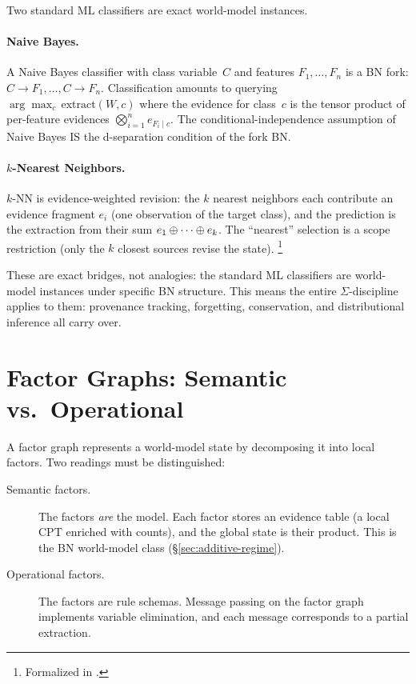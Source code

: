 \documentclass[11pt,openany]{report}
\begin{document}
Two standard ML classifiers are exact world-model instances.

\paragraph{Naive Bayes.}
A Naive Bayes classifier with class variable~$C$ and features
$F_1, \ldots, F_n$ is a BN fork: $C \to F_1, \ldots, C \to F_n$.
Classification amounts to querying
$\arg\max_c \,\mathrm{extract}(W, c)$ where the evidence for class~$c$
is the tensor product of per-feature evidences
$\bigotimes_{i=1}^n e_{F_i \mid c}$.  The conditional-independence
assumption of Naive Bayes IS the d-separation condition of the fork BN.

\paragraph{$k$-Nearest Neighbors.}
$k$-NN is evidence-weighted revision: the $k$ nearest neighbors each
contribute an evidence fragment $e_i$ (one observation of the target
class), and the prediction is the extraction from their sum
$e_1 \oplus \cdots \oplus e_k$.  The ``nearest'' selection is a scope
restriction (only the $k$ closest sources revise the state).%
\footnote{Formalized in
.}

\noindent
These are exact bridges, not analogies: the standard ML classifiers
are world-model instances under specific BN structure.  This means
the entire $\Sigma$-discipline applies to them: provenance tracking,
forgetting, conservation, and distributional inference all carry
over.


\section{Factor Graphs: Semantic vs.\ Operational}

A factor graph represents a world-model state by decomposing it into
local factors.  Two readings must be distinguished:

\begin{description}
\item[Semantic factors.] The factors \emph{are} the model.  Each factor
  stores an evidence table (a local CPT enriched with counts), and the
  global state is their product.  This is the BN world-model class
  (\S\ref{sec:additive-regime}).

\item[Operational factors.] The factors are rule schemas.  Message
  passing on the factor graph implements variable elimination, and each
  message corresponds to a partial extraction.
\end{description}
\end{document}
